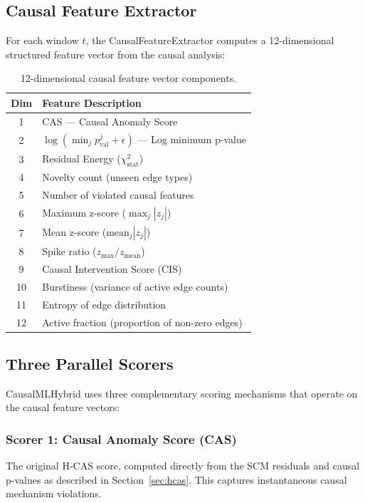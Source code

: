 \subsection{Causal Feature Extractor}

For each window $t$, the CausalFeatureExtractor computes a 12-dimensional structured feature vector from the causal analysis:

\begin{table}[htbp]
\centering
\caption{12-dimensional causal feature vector components.}
\begin{tabular}{cl}
\toprule
\textbf{Dim} & \textbf{Feature Description} \\
\midrule
1 & CAS --- Causal Anomaly Score \\
2 & $\log(\min_j p_{\text{val}}^j + \epsilon)$ --- Log minimum p-value \\
3 & Residual Energy ($\chi^2_{\text{stat}}$) \\
4 & Novelty count (unseen edge types) \\
5 & Number of violated causal features \\
6 & Maximum z-score ($\max_j |z_j|$) \\
7 & Mean z-score ($\text{mean}_j |z_j|$) \\
8 & Spike ratio ($z_{\max} / z_{\text{mean}}$) \\
9 & Causal Intervention Score (CIS) \\
10 & Burstiness (variance of active edge counts) \\
11 & Entropy of edge distribution \\
12 & Active fraction (proportion of non-zero edges) \\
\bottomrule
\end{tabular}
\label{tab:causal_features}
\end{table}

\subsection{Three Parallel Scorers}

CausalMLHybrid uses three complementary scoring mechanisms that operate on the causal feature vectors:

\subsubsection{Scorer 1: Causal Anomaly Score (CAS)}
The original H-CAS score, computed directly from the SCM residuals and causal p-values as described in Section~\ref{sec:hcas}. This captures instantaneous causal mechanism violations.

